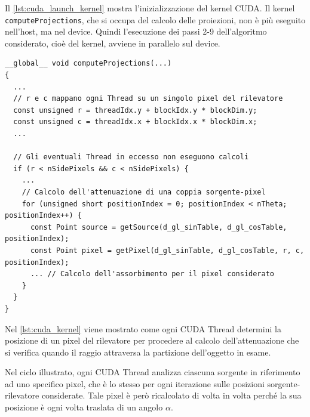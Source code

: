 \documentclass[12pt,a4paper]{report}
\begin{document}
Il \autoref{lst:cuda_launch_kernel} mostra l'inizializzazione del kernel CUDA.
Il kernel \mbox{\lstinline{computeProjections},} che si occupa del calcolo delle proiezioni, non è più eseguito nell'host,
ma nel device.
Quindi l'esecuzione dei passi 2-9 dell'algoritmo considerato, cioè del kernel, avviene in parallelo sul device.

\begin{lstlisting}[language=CStyle, caption={Codice CUDA-C del kernel.}, label={lst:cuda_kernel}]
__global__ void computeProjections(...)
{
  ...
  // r e c mappano ogni Thread su un singolo pixel del rilevatore
  const unsigned r = threadIdx.y + blockIdx.y * blockDim.y;
  const unsigned c = threadIdx.x + blockIdx.x * blockDim.x;
  ...

  // Gli eventuali Thread in eccesso non eseguono calcoli
  if (r < nSidePixels && c < nSidePixels) {
    ...
    // Calcolo dell'attenuazione di una coppia sorgente-pixel
    for (unsigned short positionIndex = 0; positionIndex < nTheta; positionIndex++) {
      const Point source = getSource(d_gl_sinTable, d_gl_cosTable, positionIndex);
      const Point pixel = getPixel(d_gl_sinTable, d_gl_cosTable, r, c, positionIndex);
      ... // Calcolo dell'assorbimento per il pixel considerato
    }
  }
}
\end{lstlisting}

Nel \autoref{lst:cuda_kernel} viene mostrato come ogni CUDA Thread determini la posizione di un pixel del rilevatore per procedere
al calcolo dell'attenuazione che si verifica quando il raggio attraversa la partizione dell'oggetto in esame.

Nel ciclo illustrato, ogni CUDA Thread analizza ciascuna sorgente in riferimento ad uno specifico pixel, che è lo stesso per ogni
iterazione sulle posizioni sorgente-rilevatore considerate.
Tale pixel è però ricalcolato di volta in volta perché la sua posizione è ogni volta traslata di un angolo \(\alpha\).
\end{document}
